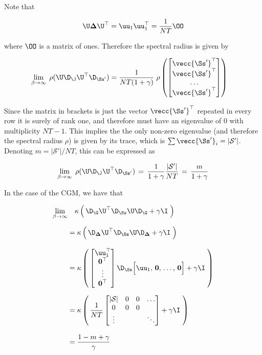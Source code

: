Note that 

\begin{equation*}
    \U \mathbf{\Delta} \U^\top = \uu_1 \uu_1^\top  = \frac{1}{NT} \OO
\end{equation*}

where $ \OO$ is a matrix of ones. Therefore the spectral radius is given by 

\begin{align*}
    \lim_{\beta \rightarrow \infty} \; \rho(\U \D_\J \U^\top \D_{\Ss'}) &= \frac{1}{NT (1 + \gamma) } \; \rho \left( \begin{bmatrix}
        \vecc{\Ss'}^\top \\ \vecc{\Ss'}^\top \\ \dots \\ \vecc{\Ss'}^\top
    \end{bmatrix} \right)
\end{align*}

Since the matrix in brackets is just the vector $\vecc{\Ss'}^\top$ repeated in every row it is surely of rank one, and therefore must have an eigenvalue of 0 with multiplicity $NT - 1$. This implies the the only non-zero eigenvalue (and therefore the spectral radius $\rho$) is given by its trace, which is $\sum \vecc{\Ss'}_i = |\mathcal{S}'|$. Denoting  $m=|\mathcal{S}'|/NT$, this can be expressed as 

\begin{equation}
    \label{eq:beta_lim_inf}
    \lim_{\beta \rightarrow \infty} \; \rho(\U \D_\J \U^\top \D_{\Ss'}) \, = \, \frac{1}{1 + \gamma} \frac{|\mathcal{S}'|}{NT} \, = \, \frac{m}{1 + \gamma}
\end{equation}

In the case of the CGM, we have that

\begin{align}
    \lim_{\beta \rightarrow \infty} & \quad \kappa \left(  \, \D_\G \U^\top \D_{\Ss} \U \D_\G + \gamma \I \; \right)  \notag \\[0.2cm]
    &= \kappa  \left(  \, \D_{\mathbf{\Delta}} \U^\top \D_{\Ss} \U \D_{\mathbf{\Delta}}  + \gamma \I \; \right) \notag \\[0.3cm]
    &= \kappa  \left(  \, 
    \begin{bmatrix} 
        \uu_1^\top \\ 
        \mathbf{0}^\top \\
        \vdots \\ 
        \mathbf{0}^\top 
    \end{bmatrix} \D_{\Ss}  \Big[ \uu_1, \, \mathbf{0}, \, \dots, \,\mathbf{0} \Big]
    + \gamma \I \; \right) \notag \\[0.2cm]
    &= \kappa  \left(  \, \frac{1}{NT}  \begin{bmatrix}
        |\mathcal{S}| & 0 & 0 & \dots \\
        0 & 0 & 0 &  \\
        \vdots & & & \ddots
    \end{bmatrix}   + \gamma \I \; \right) \notag \\[0.3cm]
    &= \frac{1 - m + \gamma}{\gamma}
\end{align}

